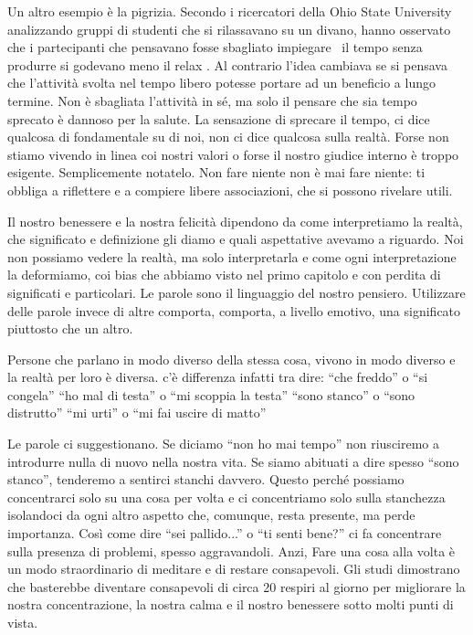 \documentclass[12pt]{book} %
\begin{document}
\begin{mdframed}[linewidth=1pt]
Un altro esempio è la pigrizia. Secondo i ricercatori della Ohio State University analizzando gruppi di studenti che si
rilassavano su un divano, hanno osservato che i partecipanti che pensavano fosse sbagliato impiegare \ il tempo senza
{\textquotedbl}produrre{\textquotedbl} si godevano meno il relax . Al contrario l'idea cambiava se
si pensava che l'attività svolta nel tempo libero potesse portare ad un beneficio a lungo termine. Non è sbagliata
l'attività in sé, ma solo il pensare che sia tempo sprecato è dannoso per la salute. La sensazione
di sprecare il tempo, ci dice qualcosa di fondamentale su di noi, non ci dice qualcosa sulla realtà. Forse non stiamo
vivendo in linea coi nostri valori o forse il nostro giudice interno è troppo esigente. Semplicemente notatelo. Non
fare niente non è mai fare niente: ti obbliga a riflettere e a compiere libere associazioni, che si possono rivelare
utili.
\end{mdframed}

Il nostro benessere e la nostra felicità dipendono da come interpretiamo la realtà, che significato e definizione gli
diamo e quali aspettative avevamo a riguardo. Noi non possiamo vedere la realtà, ma solo interpretarla e come ogni
interpretazione la deformiamo, coi bias che abbiamo visto nel primo capitolo e con perdita di significati e
particolari. Le parole sono il linguaggio del nostro pensiero. Utilizzare delle parole invece di altre comporta,
comporta, a livello emotivo, una significato piuttosto che un altro.

Persone che parlano in modo diverso della stessa cosa, vivono in modo diverso e la realtà per loro è diversa. c'è
differenza infatti tra dire:\newline
“che freddo” o “si congela”\newline
“ho mal di testa” o “mi scoppia la testa”\newline
“sono stanco” o “sono distrutto”\newline
“mi urti” o “mi fai uscire di matto”

Le parole ci suggestionano. Se diciamo “non ho mai tempo” non riusciremo a introdurre nulla di nuovo nella nostra vita.
Se siamo abituati a dire spesso “sono stanco”, tenderemo a sentirci stanchi davvero. Questo perché possiamo
concentrarci solo su una cosa per volta e ci concentriamo solo sulla stanchezza isolandoci da ogni altro aspetto che,
comunque, resta presente, ma perde importanza. Così come dire “sei pallido...” o “ti senti bene?” ci fa concentrare
sulla presenza di problemi, spesso aggravandoli. Anzi, Fare una cosa alla volta è un modo straordinario di meditare e
di restare consapevoli. Gli studi dimostrano che basterebbe diventare {\textquotedbl}consapevoli{\textquotedbl} di
circa 20 respiri al giorno per migliorare la nostra concentrazione, la nostra calma e il nostro benessere sotto molti
punti di vista.
\end{document}

